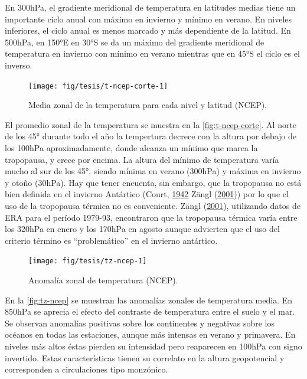 \documentclass[spanish,a4paper,12pt,oneside]{book}
\begin{document}
En 300hPa, el gradiente meridional de temperatura en latitudes medias
tiene un importante ciclo anual con máximo en invierno y mínimo en
verano. En niveles inferiores, el ciclo anual es menos marcado y más
dependiente de la latitud. En 500hPa, en 150°E en 30°S se da un máximo
del gradiente meridional de temperatura en invierno con mínimo en verano
mientras que en 45°S el ciclo es el inverso.

\begin{figure}
\texttt{[image: fig/tesis/t-ncep-corte-1]} \caption{Media zonal de la temperatura para cada nivel y latitud (NCEP).}\label{fig:t-ncep-corte}
\end{figure}

El promedio zonal de la temperatura se muestra en la
\autoref{fig:t-ncep-corte}. Al norte de los 45° durante todo el año la
tempertura decrece con la altura por debajo de los 100hPa
aproximadamente, donde alcanza un mínimo que marca la tropopausa, y
crece por encima. La altura del mínimo de temperatura varía mucho al sur
de los 45°, siendo mínima en verano (300hPa) y máxima en invierno y
otoño (30hPa). Hay que tener encuenta, sin embargo, que la tropopausa no
está bien definida en el invierno Antártico (Court,
\protect\hyperlink{ref-Court1942}{1942} Zängl
(\protect\hyperlink{ref-Zangl2001}{2001})) por lo que el uso de la
tropopausa térmica no es conveniente. Zängl
(\protect\hyperlink{ref-Zangl2001}{2001}), utilizando datos de ERA para
el período 1979-93, encontraron que la tropopausa térmica varía entre
los 320hPa en enero y los 170hPa en agosto aunque advierten que el uso
del criterio término es ``problemático'' en el invierno antártico.

\begin{landscape}\begin{figure}

{\centering \texttt{[image: fig/tesis/tz-ncep-1]} 

}

\caption{Anomalía zonal de temperatura (NCEP).}\label{fig:tz-ncep}
\end{figure}
\end{landscape}

En la \autoref{fig:tz-ncep} se muestran las anomalías zonales de
temperatura media. En 850hPa se aprecia el efecto del contraste de
temperatura entre el suelo y el mar. Se observan anomalías positivas
sobre los continentes y negativas sobre los océanos en todas las
estaciones, aunque más intensas en verano y primavera. En niveles más
altos éstas pierden su intensidad pero reaparecen en 100hPa con signo
invertido. Estas características tienen su correlato en la altura
geopotencial y corresponden a circulaciones tipo monzónico.
\end{document}
